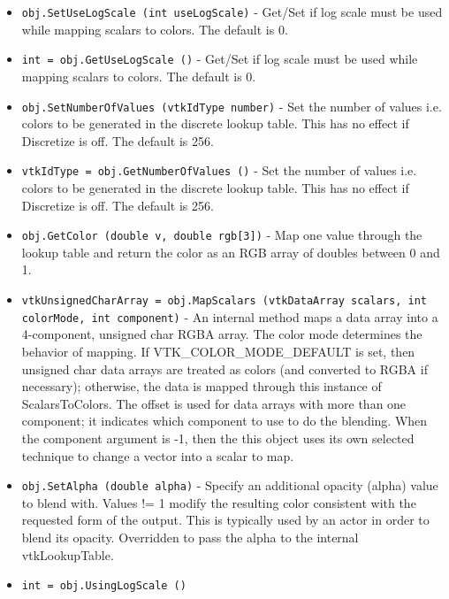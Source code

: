 \begin{itemize}
\item  \verb|obj.SetUseLogScale (int useLogScale)| -  Get/Set if log scale must be used while mapping scalars
 to colors. The default is 0.

\item  \verb|int = obj.GetUseLogScale ()| -  Get/Set if log scale must be used while mapping scalars
 to colors. The default is 0.

\item  \verb|obj.SetNumberOfValues (vtkIdType number)| -  Set the number of values i.e. colors to be generated in the
 discrete lookup table. This has no effect if Discretize is off.
 The default is 256.

\item  \verb|vtkIdType = obj.GetNumberOfValues ()| -  Set the number of values i.e. colors to be generated in the
 discrete lookup table. This has no effect if Discretize is off.
 The default is 256.

\item  \verb|obj.GetColor (double v, double rgb[3])| -  Map one value through the lookup table and return the color as
 an RGB array of doubles between 0 and 1.

\item  \verb|vtkUnsignedCharArray = obj.MapScalars (vtkDataArray scalars, int colorMode, int component)| -  An internal method maps a data array into a 4-component, unsigned char
 RGBA array. The color mode determines the behavior of mapping. If 
 VTK\_COLOR\_MODE\_DEFAULT is set, then unsigned char data arrays are
 treated as colors (and converted to RGBA if necessary); otherwise, 
 the data is mapped through this instance of ScalarsToColors. The offset
 is used for data arrays with more than one component; it indicates 
 which component to use to do the blending.
 When the component argument is -1, then the this object uses its
 own selected technique to change a vector into a scalar to map.

\item  \verb|obj.SetAlpha (double alpha)| -  Specify an additional opacity (alpha) value to blend with. Values
 != 1 modify the resulting color consistent with the requested
 form of the output. This is typically used by an actor in order to
 blend its opacity.
 Overridden to pass the alpha to the internal vtkLookupTable.

\item  \verb|int = obj.UsingLogScale ()|

\end{itemize}
